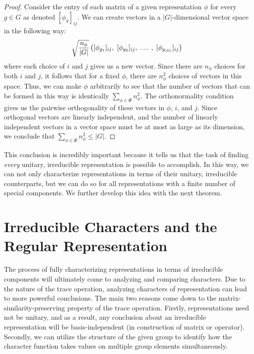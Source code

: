 \begin{proof}\cite{Tung}  Consider the entry of each matrix of a given representation $\phi$ for every $g \in G$ as denoted $[\phi_g]_{ij}$. We can create vectors in a $|G|$-dimensional vector space in the following way:
$$\sqrt{\frac{n_\phi}{|G|}}\left([\phi_{g_1}]_{ij},\hspace{1mm} [\phi_{g_2}]_{ij}, \hspace{1mm}\hdots \hspace{1mm},\hspace{1mm} [\phi_{g_{|G|}}]_{ij}\right)$$
where each choice of $i$ and $j$ gives us a new vector. Since there are $n_\phi$ choices for both $i$ and $j$, it follows that for a fixed $\phi$, there are $n_\phi^2$ choices of vectors in this space. Thus, we can make $\phi$ arbitrarily to see that the number of vectors that can be formed in this way is identically $\sum_{\phi \in \Phi}n^2_\phi$. The orthonormality condition gives us the pairwise orthogonality of these vectors in $\phi$, $i$, and $j$. Since orthogonal vectors are linearly independent, and the number of linearly independent vectors in a vector space must be at most as large as its dimension, we conclude that $\sum_{\phi \in \Phi}n^2_\phi \leq |G|$.  \end{proof}


This conclusion is incredibly important because it tells us that the task of finding \textit{every} unitary, irreducible representation is possible to accomplish. In this way, we can not only characterize representations in terms of their unitary, irreducible counterparts, but we can do so for all representations with a finite number of special components. We further develop this idea with the next theorem.


\section{Irreducible Characters and the Regular Representation}

The process of fully characterizing representations in terms of irreducible components will ultimately come to analyzing and comparing characters. Due to the nature of the trace operation, analyzing characters of representation can lead to more powerful conclusions. The main two reasons come down to the matrix-similarity-preserving property of the trace operation. Firstly, representations need not be unitary, and as a result, any conclusion about an irreducible representation will be basis-independent (in construction of matrix or operator). Secondly, we can utilize the structure of the given group to identify how the character function takes values on multiple group elements simultaneously. 

